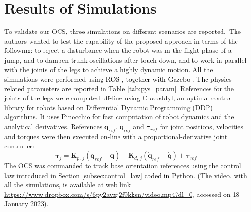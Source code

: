 \documentclass[sensors,article,accept,pdftex,moreauthors]{Definitions/mdpi}
\newcommand{\MF}[1]{\textcolor{black}{#1}}
\begin{document}
\section{Results of Simulations}
\label{sec:simulations}
To validate our OCS, three simulations on different scenarios {are reported.~The authors} wanted to test the capability of the proposed approach in terms of the following: 
to reject a disturbance when the robot was in the flight phase of a jump, and to dampen trunk oscillations after touch-down, 
and to work in parallel with the joints of the legs to achieve a highly dynamic motion. 
All the simulations were performed using \MF{ROS \cite{quigley2009ros}, together with Gazebo \cite{koenig2004design}. The physics-related parameters are reported in Table \ref{tab:pys_param}.} References for the joints of the legs were computed off-line using Crocoddyl, an optimal control library for robots based on Differential Dynamic Programming (DDP) algorithms. It uses Pinocchio for fast computation of robot dynamics and the analytical derivatives. References $\bm{q}_{ref}$, $\dot{\bm{q}}_{ref}$ and $\bm{\tau}_{ref}$ for joint positions, velocities and torques were then executed on-line with a proportional-derivative joint controller:
\begin{equation}
\bm{\tau}_j = \bm{K}_{p,\, j} (\bm{q}_{ref} - \bm{q}) + \bm{K}_{d,\, j} (\dot{\bm{q}}_{ref} - \dot{\bm{q}}) + \bm{\tau}_{ref}
\end{equation}
The OCS was commanded to track base orientation references using the control law introduced in Section \ref{subsec:control_law} \MF{coded in Python}. (The %
video, with all the simulations, is available at web link \url{https://www.dropbox.com/s/6py2avxj2f9kksn/video.mp4?dl=0}, accessed %
 on 18 January 2023).
\end{document}
